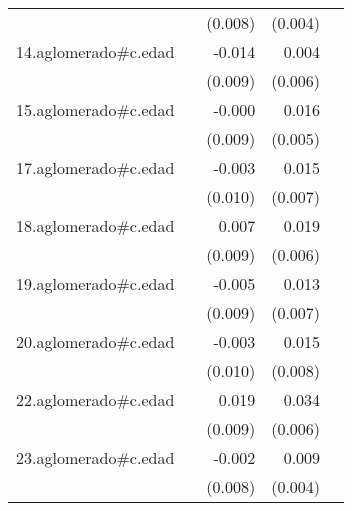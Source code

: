 {\begin{longtable}{l*{4}{D{.}{.}{-1}}}
            &                     &     (0.008)         &     (0.004)         &                     \\
\addlinespace
14.aglomerado#c.edad&                     &      -0.014         &       0.004         &                     \\
            &                     &     (0.009)         &     (0.006)         &                     \\
\addlinespace
15.aglomerado#c.edad&                     &      -0.000         &       0.016\sym{**} &                     \\
            &                     &     (0.009)         &     (0.005)         &                     \\
\addlinespace
17.aglomerado#c.edad&                     &      -0.003         &       0.015\sym{*}  &                     \\
            &                     &     (0.010)         &     (0.007)         &                     \\
\addlinespace
18.aglomerado#c.edad&                     &       0.007         &       0.019\sym{**} &                     \\
            &                     &     (0.009)         &     (0.006)         &                     \\
\addlinespace
19.aglomerado#c.edad&                     &      -0.005         &       0.013\sym{*}  &                     \\
            &                     &     (0.009)         &     (0.007)         &                     \\
\addlinespace
20.aglomerado#c.edad&                     &      -0.003         &       0.015         &                     \\
            &                     &     (0.010)         &     (0.008)         &                     \\
\addlinespace
22.aglomerado#c.edad&                     &       0.019\sym{*}  &       0.034\sym{***}&                     \\
            &                     &     (0.009)         &     (0.006)         &                     \\
\addlinespace
23.aglomerado#c.edad&                     &      -0.002         &       0.009\sym{*}  &                     \\
            &                     &     (0.008)         &     (0.004)         &                     \\

\end{longtable}}
